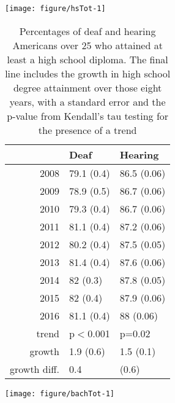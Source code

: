 \documentclass{article}\usepackage[]{graphicx}\usepackage[]{color}
\makeatletter
\def\maxwidth{ %
  \ifdim\Gin@nat@width>\linewidth
    \linewidth
  \else
    \Gin@nat@width
  \fi
}
\newenvironment{knitrout}{}{} %
\makeatother
\begin{document}
\begin{center}


\begin{knitrout}
\color{fgcolor}
\texttt{[image: figure/hsTot-1]}

\end{knitrout}
\end{center}

\begin{table}[ht]
\centering
\begin{tabular}{rll}
  \hline
 & Deaf & Hearing \\
  \hline
2008 & 79.1 (0.4) & 86.5 (0.06) \\
  2009 & 78.9 (0.5) & 86.7 (0.06) \\
  2010 & 79.3 (0.4) & 86.7 (0.06) \\
  2011 & 81.1 (0.4) & 87.2 (0.06) \\
  2012 & 80.2 (0.4) & 87.5 (0.05) \\
  2013 & 81.4 (0.4) & 87.6 (0.06) \\
  2014 & 82 (0.3) & 87.8 (0.05) \\
  2015 & 82 (0.4) & 87.9 (0.06) \\
  2016 & 81.1 (0.4) & 88 (0.06) \\
  trend & p$<$0.001 & p=0.02 \\
  growth & 1.9 (0.6) & 1.5 (0.1) \\
  growth diff. & 0.4 & (0.6) \\
   \hline
\end{tabular}
\caption{Percentages of deaf and hearing Americans over 25 who attained at least a high school diploma. The final line includes the growth in high school degree attainment over those eight years, with a standard error and the p-value from Kendall's tau testing for the presence of a trend}
\end{table}




\begin{center}
\begin{knitrout}
\color{fgcolor}
\texttt{[image: figure/bachTot-1]}

\end{knitrout}

\end{center}
\end{document}
